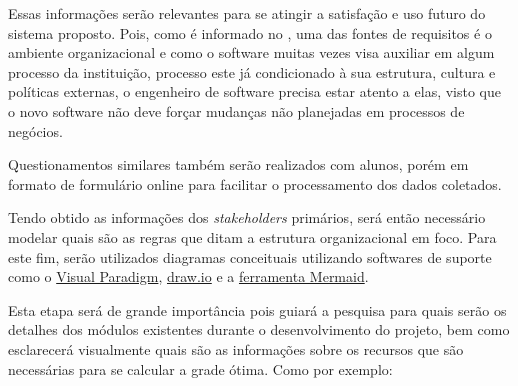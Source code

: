 Essas informações serão relevantes para se atingir a satisfação e uso futuro do sistema proposto. Pois, como é informado no \cite{bourque_swebok_2014}, uma das fontes de requisitos é o ambiente organizacional e como o software muitas vezes visa auxiliar em algum processo da instituição, processo este já condicionado à sua estrutura, cultura e políticas externas, o engenheiro de software precisa estar atento a elas, visto que o novo software não deve forçar mudanças não planejadas em processos de negócios.

Questionamentos similares também serão realizados com alunos, porém em formato de formulário online para facilitar o processamento dos dados coletados.

\def\LinkParadigm{https://www.visual-paradigm.com/}
\def\LinkDrawio{https://www.drawio.com/}
\def\LinkMermaid{https://mermaid.js.org/}

Tendo obtido as informações dos \textit{stakeholders} primários, será então necessário modelar quais são as regras que ditam a estrutura organizacional em foco. Para este fim, serão utilizados diagramas conceituais utilizando softwares de suporte como o \href{\LinkParadigm}{Visual Paradigm}, \href{\LinkDrawio}{draw.io} e a \href{\LinkMermaid}{ferramenta Mermaid}.


Esta etapa será de grande importância pois guiará a pesquisa para quais serão os detalhes dos módulos existentes durante o desenvolvimento do projeto, bem como esclarecerá visualmente quais são as informações sobre os recursos que são necessárias para se calcular a grade ótima. Como por exemplo:

